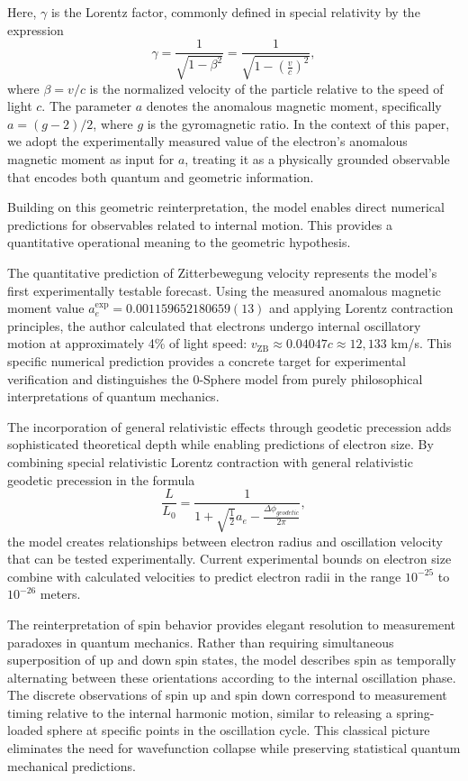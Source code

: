 \documentclass[%
 reprint,
 amsmath,amssymb,
 aps,
]{revtex4-1}
\numberwithin{equation}{section}%
\begin{document}
Here, \( \gamma \) is the Lorentz factor, commonly defined in special relativity by the expression
\begin{equation}
\gamma = \frac{1}{\sqrt{1 - \beta^2}} = \frac{1}{\sqrt{1 - \left( \frac{v}{c} \right)^2}},
\label{eq:lorentz_factor_definition}
\end{equation}
where \( \beta = v/c \) is the normalized velocity of the particle relative to the speed of light \( c \). The parameter \( a \) denotes the anomalous magnetic moment, specifically \( a = (g - 2)/2 \), where \( g \) is the gyromagnetic ratio. In the context of this paper, we adopt the experimentally measured value of the electron's anomalous magnetic moment as input for \( a \), treating it as a physically grounded observable that encodes both quantum and geometric information.

Building on this geometric reinterpretation, the model enables direct numerical predictions for observables related to internal motion. This provides a quantitative operational meaning to the geometric hypothesis.

The quantitative prediction of Zitterbewegung velocity represents the model's first experimentally testable forecast. Using the measured anomalous magnetic moment value $a_e^{\exp} = 0.001159652180659(13)$ and applying Lorentz contraction principles, the author calculated that electrons undergo internal oscillatory motion at approximately 4\% of light speed: $v_{\mathrm{ZB}} \approx 0.04047c \approx 12,133$ km/s. This specific numerical prediction provides a concrete target for experimental verification and distinguishes the 0-Sphere model from purely philosophical interpretations of quantum mechanics.

The incorporation of general relativistic effects through geodetic precession adds sophisticated theoretical depth while enabling predictions of electron size. By combining special relativistic Lorentz contraction with general relativistic geodetic precession in the formula
\begin{equation}
\frac{L}{L_0} = \frac{1}{1 + \sqrt{\frac{1}{2}}a_e - \frac{\Delta\phi_{geodetic}}{2\pi}},
\end{equation}
the model creates relationships between electron radius and oscillation velocity that can be tested experimentally. Current experimental bounds on electron size combine with calculated velocities to predict electron radii in the range $10^{-25}$ to $10^{-26}$ meters.

The reinterpretation of spin behavior provides elegant resolution to measurement paradoxes in quantum mechanics. Rather than requiring simultaneous superposition of up and down spin states, the model describes spin as temporally alternating between these orientations according to the internal oscillation phase. The discrete observations of spin up and spin down correspond to measurement timing relative to the internal harmonic motion, similar to releasing a spring-loaded sphere at specific points in the oscillation cycle. This classical picture eliminates the need for wavefunction collapse while preserving statistical quantum mechanical predictions.
\end{document}
